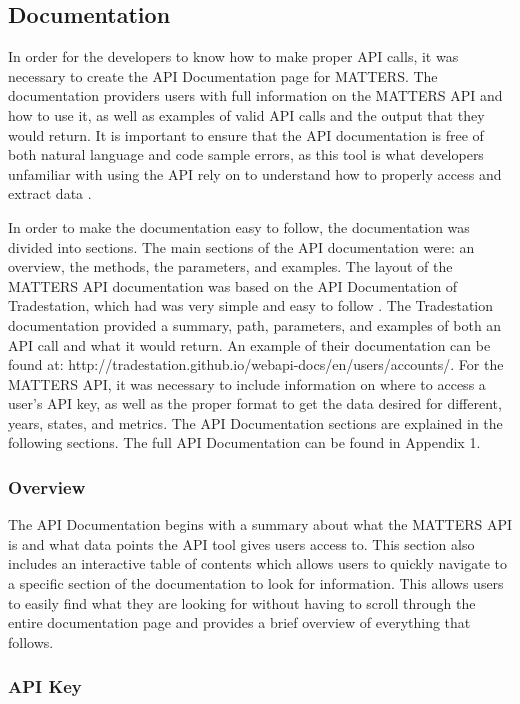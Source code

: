 		\subsection{Documentation}
			
			In order for the developers to know how to make proper API calls, it was necessary to create the API Documentation page for MATTERS. The documentation providers users with full information on the MATTERS API and how to use it, as well as examples of valid API calls and the output that they would return. It is important to ensure that the API documentation is free of both natural language and code sample errors, as this tool is what developers unfamiliar with using the API rely on to understand how to properly access and extract data \cite{errors}. 
			
			In order to make the documentation easy to follow, the documentation was divided into sections. The main sections of the API documentation were: an overview, the methods, the parameters, and examples. The layout of the MATTERS API documentation was based on the API Documentation of Tradestation, which had was very simple and easy to follow \cite{apiex}. The Tradestation documentation provided a summary, path, parameters, and examples of both an API call and what it would return. An example of their documentation can be found at: http://tradestation.github.io/webapi-docs/en/users/accounts/. For the MATTERS API, it was necessary to include information on where to access a user’s API key, as well as the proper format to get the data desired for different, years, states, and metrics. The API Documentation sections are explained in the following sections. The full API Documentation can be found in Appendix 1.
			
			
		\subsubsection{Overview}
			
		The API Documentation begins with a summary about what the MATTERS API is and what data points the API tool gives users access to. This section also includes an interactive table of contents which allows users to quickly navigate to a specific section of the documentation to look for information. This allows users to easily find what they are looking for without having to scroll through the entire documentation page and provides a brief overview of everything that follows.
			
			\subsubsection{API Key}
			
